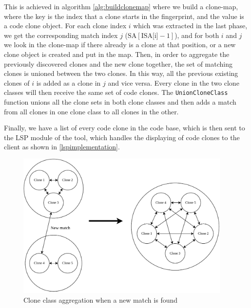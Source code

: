 This is achieved in algorithm \ref{alg:buildclonemap} where we build a clone-map, where
the key is the index that a clone starts in the fingerprint, and the value is a code clone
object. For each clone index $i$ which was extracted in the last phase, we get the
corresponding match index $j$ ($\text{SA}[\text{ISA[i]} - 1]$), and for both $i$ and $j$
we look in the clone-map if there already is a clone at that position, or a new clone
object is created and put in the map. Then, in order to aggregate the previously
discovered clones and the new clone together, the set of matching clones is unioned
between the two clones. In this way, all the previous existing clones of $i$ is added as a
clone in $j$ and vice versa. Every clone in the two clone classes will then receive the
same set of code clones. The \verb|UnionCloneClass| function unions all the clone sets in
both clone classes and then adds a match from all clones in one clone class to all clones
in the other.

Finally, we have a list of every code clone in the code base, which is then sent to the
LSP module of the tool, which handles the displaying of code clones to the client as
shown in \cref{lspimplementation}.

\begin{figure}[t]
    \begin{center}
        \includegraphics[width=0.95\textwidth]{figures/cloneaggregation.drawio.pdf}
    \end{center}
    \caption{Clone class aggregation when a new match is found}
    \label{fig:cloneaggregation}
\end{figure}


